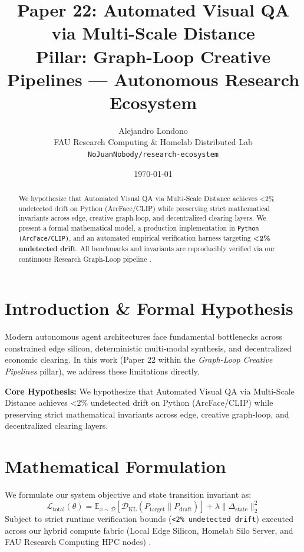 \documentclass[10pt,twocolumn]{article}
\title{\textbf{Paper 22: Automated Visual QA via Multi-Scale Distance}\\
\large Pillar: Graph-Loop Creative Pipelines --- Autonomous Research Ecosystem}
\author{
  Alejandro Londono \\
  FAU Research Computing \& Homelab Distributed Lab \\
  \texttt{NoJuanNobody/research-ecosystem}
}
\date{\today}
\begin{document}
\maketitle

\begin{abstract}
We hypothesize that Automated Visual QA via Multi-Scale Distance achieves <2\% undetected drift on Python (ArcFace/CLIP) while preserving strict mathematical invariants across edge, creative graph-loop, and decentralized clearing layers.
We present a formal mathematical model, a production implementation in \texttt{Python (ArcFace/CLIP)}, and an automated empirical verification harness targeting \textbf{<2\% undetected drift}. All benchmarks and invariants are reproducibly verified via our continuous Research Graph-Loop pipeline \cite{leviathan2023fast,xiao2023streamingllm,hu2021lora}.
\end{abstract}

\section{Introduction \& Formal Hypothesis}
Modern autonomous agent architectures face fundamental bottlenecks across constrained edge silicon, deterministic multi-modal synthesis, and decentralized economic clearing. In this work (Paper 22 within the \textit{Graph-Loop Creative Pipelines} pillar), we address these limitations directly.

\textbf{Core Hypothesis:} We hypothesize that Automated Visual QA via Multi-Scale Distance achieves <2\% undetected drift on Python (ArcFace/CLIP) while preserving strict mathematical invariants across edge, creative graph-loop, and decentralized clearing layers.

\section{Mathematical Formulation}
We formulate our system objective and state transition invariant as:
\begin{equation}
\mathcal{L}_{\text{total}}(\theta) = \mathbb{E}_{x \sim \mathcal{D}}\left[\mathcal{D}_{\text{KL}}(P_{\text{target}} \parallel P_{\text{draft}})\right] + \lambda \|\Delta_{\text{state}}\|_2^2
\end{equation}
Subject to strict runtime verification bounds (\texttt{<2\% undetected drift}) executed across our hybrid compute fabric (Local Edge Silicon, Homelab Silo Server, and FAU Research Computing HPC nodes) \cite{rafailov2023dpo,shapley1953value,hanson2003combinatorial}.
\end{document}
